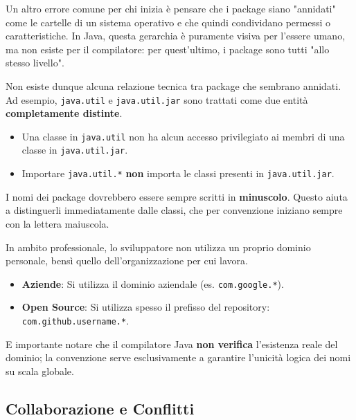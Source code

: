 Un altro errore comune per chi inizia è pensare che i package siano "annidati" come le cartelle di un sistema operativo e che quindi condividano permessi o caratteristiche. In Java, questa gerarchia è puramente visiva per l'essere umano, ma non esiste per il compilatore: per quest'ultimo, i package sono tutti "allo stesso livello". 

Non esiste dunque alcuna relazione tecnica tra package che sembrano annidati. Ad esempio, \texttt{java.util} e \texttt{java.util.jar} sono trattati come due entità \textbf{completamente distinte}. 
\begin{itemize}
    \item Una classe in \texttt{java.util} non ha alcun accesso privilegiato ai membri di una classe in \texttt{java.util.jar}.
    \item Importare \texttt{java.util.*} \textbf{non} importa le classi presenti in \texttt{java.util.jar}.
\end{itemize}

\begin{tip}
    I nomi dei package dovrebbero essere sempre scritti in \textbf{minuscolo}. Questo aiuta a distinguerli immediatamente dalle classi, che per convenzione iniziano sempre con la lettera maiuscola.
\end{tip}

\begin{observation}
    In ambito professionale, lo sviluppatore non utilizza un proprio dominio personale, bensì quello dell'organizzazione per cui lavora. 
    \begin{itemize}
        \item \textbf{Aziende}: Si utilizza il dominio aziendale (es. \texttt{com.google.*}).
        \item \textbf{Open Source}: Si utilizza spesso il prefisso del repository: \\[2pt] \quad\texttt{com.github.username.*}.
    \end{itemize}
    E importante notare che il compilatore Java \textbf{non verifica} l'esistenza reale del dominio; la convenzione serve esclusivamente a garantire l'unicità logica dei nomi su scala globale.
\end{observation}

\subsection{Collaborazione e Conflitti}

